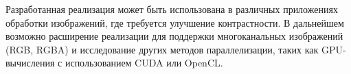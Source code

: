 \documentclass[a4paper,14pt]{article}
\begin{document}
Разработанная реализация может быть использована в различных приложениях обработки изображений, 
где требуется улучшение контрастности. В дальнейшем возможно расширение реализации для поддержки 
многоканальных изображений (RGB, RGBA) и исследование других методов параллелизации, таких как 
GPU-вычисления с использованием CUDA или OpenCL.
\end{document}

